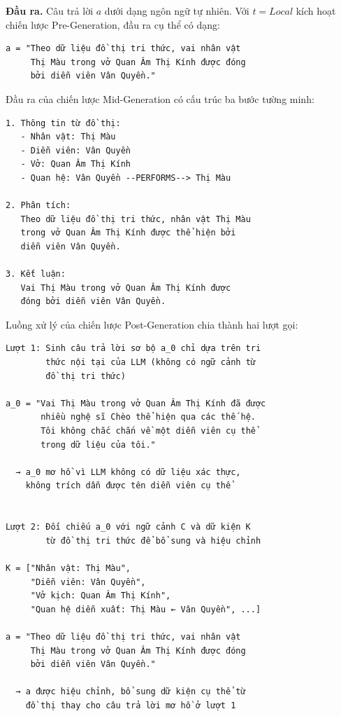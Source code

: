 \textbf{Đầu ra.} Câu trả lời $a$ dưới dạng ngôn ngữ tự nhiên. Với $t = \textit{Local}$ kích hoạt chiến lược Pre-Generation, đầu ra cụ thể có dạng:

\begin{tcolorbox}[colback=gray!5, colframe=black!50, arc=4pt, boxrule=0.5pt]
{\small
\begin{verbatim}
a = "Theo dữ liệu đồ thị tri thức, vai nhân vật
     Thị Màu trong vở Quan Âm Thị Kính được đóng
     bởi diễn viên Vân Quyền."
\end{verbatim}
}
\end{tcolorbox}

Đầu ra của chiến lược Mid-Generation có cấu trúc ba bước tường minh:

\begin{tcolorbox}[colback=gray!5, colframe=black!50, arc=4pt, boxrule=0.5pt]
{\small
\begin{verbatim}
1. Thông tin từ đồ thị:
   - Nhân vật: Thị Màu
   - Diễn viên: Vân Quyền
   - Vở: Quan Âm Thị Kính
   - Quan hệ: Vân Quyền --PERFORMS--> Thị Màu

2. Phân tích:
   Theo dữ liệu đồ thị tri thức, nhân vật Thị Màu
   trong vở Quan Âm Thị Kính được thể hiện bởi
   diễn viên Vân Quyền.

3. Kết luận:
   Vai Thị Màu trong vở Quan Âm Thị Kính được
   đóng bởi diễn viên Vân Quyền.
\end{verbatim}
}
\end{tcolorbox}

Luồng xử lý của chiến lược Post-Generation chia thành hai lượt gọi:

\begin{tcolorbox}[colback=gray!5, colframe=black!50, arc=4pt, boxrule=0.5pt]
{\small
\begin{verbatim}
Lượt 1: Sinh câu trả lời sơ bộ a_0 chỉ dựa trên tri
        thức nội tại của LLM (không có ngữ cảnh từ
        đồ thị tri thức)

a_0 = "Vai Thị Màu trong vở Quan Âm Thị Kính đã được
       nhiều nghệ sĩ Chèo thể hiện qua các thế hệ.
       Tôi không chắc chắn về một diễn viên cụ thể
       trong dữ liệu của tôi."

  → a_0 mơ hồ vì LLM không có dữ liệu xác thực,
    không trích dẫn được tên diễn viên cụ thể


Lượt 2: Đối chiếu a_0 với ngữ cảnh C và dữ kiện K
        từ đồ thị tri thức để bổ sung và hiệu chỉnh

K = ["Nhân vật: Thị Màu",
     "Diễn viên: Vân Quyền",
     "Vở kịch: Quan Âm Thị Kính",
     "Quan hệ diễn xuất: Thị Màu ← Vân Quyền", ...]

a = "Theo dữ liệu đồ thị tri thức, vai nhân vật
     Thị Màu trong vở Quan Âm Thị Kính được đóng
     bởi diễn viên Vân Quyền."

  → a được hiệu chỉnh, bổ sung dữ kiện cụ thể từ
    đồ thị thay cho câu trả lời mơ hồ ở lượt 1
\end{verbatim}
}
\end{tcolorbox}


